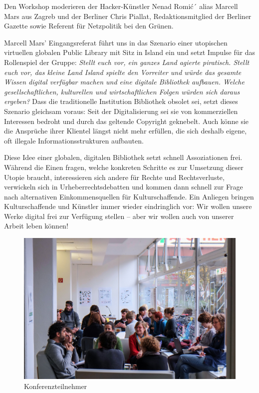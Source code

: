 \documentclass[a4paper,
fontsize=11pt,
oneside,
numbers=noperiodatend,
parskip=half-,
bibliography=totoc,
final
]{scrartcl}
\begin{document}
Den Workshop moderieren der Hacker-Künstler Nenad Romić´ alias Marcell
Mars aus Zagreb und der Berliner Chris Piallat, Redaktionsmitglied der
Berliner Gazette sowie Referent für Netzpolitik bei den Grünen.

Marcell Mars' Eingangsreferat führt uns in das Szenario einer utopischen
virtuellen globalen Public Library mit Sitz in Island ein und setzt
Impulse für das Rollenspiel der Gruppe: \emph{Stellt euch vor, ein
ganzes Land agierte piratisch. Stellt euch vor, das kleine Land Island
spielte den Vorreiter und würde das gesamte Wissen digital verfügbar
machen und eine digitale Bibliothek aufbauen. Welche gesellschaftlichen,
kulturellen und wirtschaftlichen Folgen würden sich daraus ergeben?}
Dass die traditionelle Institution Bibliothek obsolet sei, setzt dieses
Szenario gleichsam voraus: Seit der Digitalisierung sei sie von
kommerziellen Interessen bedroht und durch das geltende Copyright
geknebelt. Auch könne sie die Ansprüche ihrer Klientel längst nicht mehr
erfüllen, die sich deshalb eigene, oft illegale Informationsstrukturen
aufbauten.~

Diese Idee einer globalen, digitalen Bibliothek setzt schnell
Assoziationen frei. Während die Einen fragen, welche konkreten Schritte
es zur Umsetzung dieser Utopie braucht, interessieren sich andere für
Rechte und Rechtsverluste, verwickeln sich in Urheberrechtsdebatten und
kommen dann schnell zur Frage nach alternativen Einkommensquellen für
Kulturschaffende. Ein Anliegen bringen Kulturschaffende und Künstler
immer wieder eindringlich vor: Wir wollen unsere Werke digital frei zur
Verfügung stellen -- aber wir wollen auch von unserer Arbeit leben
können!~

\begin{figure}[htbp]
\centering
\includegraphics{./img/Konferenzteilnehmer.jpg}
\caption{Konferenzteilnehmer}
\end{figure}
\end{document}
